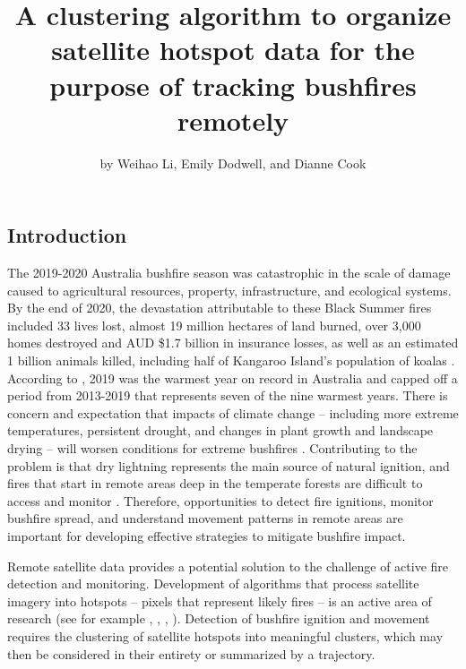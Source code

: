 \title{A clustering algorithm to organize satellite hotspot data for the
purpose of tracking bushfires remotely}
\author{by Weihao Li, Emily Dodwell, and Dianne Cook}

\maketitle


\hypertarget{introduction}{%
\subsection{Introduction}\label{introduction}}

The 2019-2020 Australia bushfire season was catastrophic in the scale of
damage caused to agricultural resources, property, infrastructure, and
ecological systems. By the end of 2020, the devastation attributable to
these Black Summer fires included 33 lives lost, almost 19 million
hectares of land burned, over 3,000 homes destroyed and AUD \$1.7
billion in insurance losses, as well as an estimated 1 billion animals
killed, including half of Kangaroo Island's population of koalas
\citep{Filkov2020}. According to \citet{climate2020}, 2019 was the
warmest year on record in Australia and capped off a period from
2013-2019 that represents seven of the nine warmest years. There is
concern and expectation that impacts of climate change -- including more
extreme temperatures, persistent drought, and changes in plant growth
and landscape drying -- will worsen conditions for extreme bushfires
\citep{climate2020, Deb2020}. Contributing to the problem is that dry
lightning represents the main source of natural ignition, and fires that
start in remote areas deep in the temperate forests are difficult to
access and monitor \citep{Abram2021}. Therefore, opportunities to detect
fire ignitions, monitor bushfire spread, and understand movement
patterns in remote areas are important for developing effective
strategies to mitigate bushfire impact.

Remote satellite data provides a potential solution to the challenge of
active fire detection and monitoring. Development of algorithms that
process satellite imagery into hotspots -- pixels that represent likely
fires -- is an active area of research (see for example
\citet{Giglio2016}, \citet{Xu2017}, \citet{Wickramasinghe2016},
\citet{Jang2019}). Detection of bushfire ignition and movement requires
the clustering of satellite hotspots into meaningful clusters, which may
then be considered in their entirety or summarized by a trajectory.

